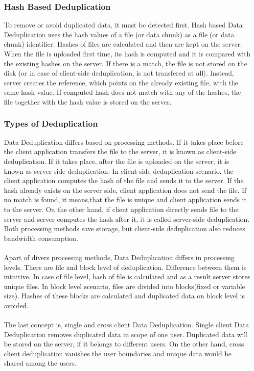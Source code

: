 \documentclass[12pt]{article}
\begin{document}
\subsubsection{Hash Based Deduplication}
\label{subsub:HashBased}
To remove or avoid duplicated data, it must be detected first. Hash based Data Deduplication uses the hash values of a file (or data chunk) as a file (or data chunk) identifier. Hashes of files are calculated and then are kept on the server. When the file is uploaded first time, its hash is computed and it is compared with the existing hashes on the server. If there is a match, the file is not stored on the disk (or in case of client-side deduplication, is not transfered at all). Instead, server creates the reference, which points on the already existing file, with the same hash value. If computed hash does not match with any of the hashes, the file together with the hash value is stored on the server.\cite{DeDupOverView}

\subsubsection{Types of Deduplication}
\label{subsub:TypesOfDedup}
Data Deduplication differs based on processing methods. If it takes place before the client application transfers the file to the server, it is known as client-side deduplication. If it takes place, after the file is uploaded on the server, it is known as server side deduplication. In client-side deduplication scenario, the client application computes the hash of the file and sends it to the server. If the hash already exists on the server side, client application does not send the file. If no match is found, it means,that the file is unique and client application sends it to the server. On the other hand, if client application directly sends file to the server and server computes the hash after it, it is called server-side deduplication. Both processing methods save storage, but client-side deduplication also reduces bandwidth consumption.\cite{DeDupMethods}\\\\
Apart of divers processing methods, Data Deduplication differs in processing levels. There are file  and block level of deduplication. Difference between them is intuitive. In case of file level, hash of file is calculated and as a result server stores unique files. In block level scenario, files are divided into blocks(fixed or variable size). Hashes of these blocks are calculated and duplicated data on block level is avoided. \cite{DeDupMethods}\\\\
The last concept is, single and cross client Data Deduplication. Single client Data Deduplication removes duplicated data  in scope of one user. Duplicated data will be stored on the server, if it belongs to different users. On the other hand, cross client deduplication vanishes the user boundaries and unique data would be shared among the users.\cite{DeDupMethods}
\end{document}
